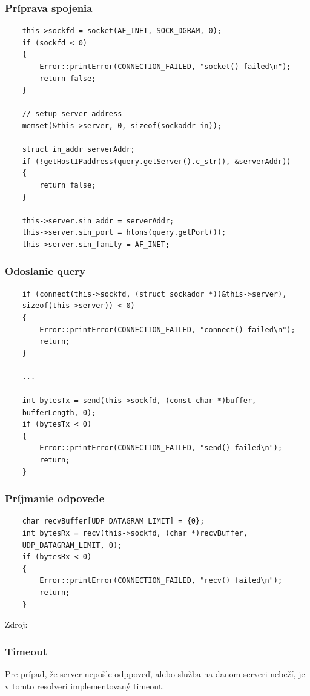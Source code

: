 \subsubsection{Príprava spojenia}
\begin{verbatim}
    this->sockfd = socket(AF_INET, SOCK_DGRAM, 0);
    if (sockfd < 0)
    {
        Error::printError(CONNECTION_FAILED, "socket() failed\n");
        return false;
    }

    // setup server address
    memset(&this->server, 0, sizeof(sockaddr_in));

    struct in_addr serverAddr;
    if (!getHostIPaddress(query.getServer().c_str(), &serverAddr))
    {
        return false;
    }

    this->server.sin_addr = serverAddr;
    this->server.sin_port = htons(query.getPort());
    this->server.sin_family = AF_INET;
\end{verbatim}

\subsubsection{Odoslanie query}
\begin{verbatim}
    if (connect(this->sockfd, (struct sockaddr *)(&this->server), 
    sizeof(this->server)) < 0)
    {
        Error::printError(CONNECTION_FAILED, "connect() failed\n");
        return;
    }
    
    ...

    int bytesTx = send(this->sockfd, (const char *)buffer, 
    bufferLength, 0);
    if (bytesTx < 0)
    {
        Error::printError(CONNECTION_FAILED, "send() failed\n");
        return;
    }
\end{verbatim}


\subsubsection{Príjmanie odpovede}

\begin{verbatim}
    char recvBuffer[UDP_DATAGRAM_LIMIT] = {0};
    int bytesRx = recv(this->sockfd, (char *)recvBuffer, 
    UDP_DATAGRAM_LIMIT, 0);
    if (bytesRx < 0)
    {
        Error::printError(CONNECTION_FAILED, "recv() failed\n");
        return;
    }
\end{verbatim}

Zdroj: \cite{UDPSockets}

\subsubsection{Timeout}
Pre prípad, že server nepošle odppoveď, alebo služba na danom serveri nebeží, je v tomto resolveri implementovaný timeout.\cite{timeout}

